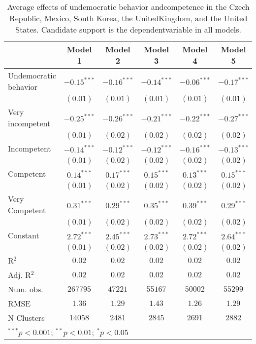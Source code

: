 
\begin{table}[!htbp]
\caption{Average effects of undemocratic behavior andcompetence in the Czech Republic, Mexico, South Korea, the UnitedKingdom, and the United States. Candidate support is the dependentvariable in all models.}
\begin{center}
\begin{tabular}{l c c c c c}
\hline
 & Model 1 & Model 2 & Model 3 & Model 4 & Model 5 \\
\hline
Undemocratic behavior & $-0.15^{***}$ & $-0.16^{***}$ & $-0.14^{***}$ & $-0.06^{***}$ & $-0.17^{***}$ \\
                      & $(0.01)$      & $(0.01)$      & $(0.01)$      & $(0.01)$      & $(0.01)$      \\
Very incompetent      & $-0.25^{***}$ & $-0.26^{***}$ & $-0.21^{***}$ & $-0.22^{***}$ & $-0.27^{***}$ \\
                      & $(0.01)$      & $(0.02)$      & $(0.02)$      & $(0.02)$      & $(0.02)$      \\
Incompetent           & $-0.14^{***}$ & $-0.12^{***}$ & $-0.12^{***}$ & $-0.16^{***}$ & $-0.13^{***}$ \\
                      & $(0.01)$      & $(0.02)$      & $(0.02)$      & $(0.02)$      & $(0.02)$      \\
Competent             & $0.14^{***}$  & $0.17^{***}$  & $0.15^{***}$  & $0.13^{***}$  & $0.15^{***}$  \\
                      & $(0.01)$      & $(0.02)$      & $(0.02)$      & $(0.02)$      & $(0.02)$      \\
Very Competent        & $0.31^{***}$  & $0.29^{***}$  & $0.35^{***}$  & $0.39^{***}$  & $0.29^{***}$  \\
                      & $(0.01)$      & $(0.02)$      & $(0.02)$      & $(0.02)$      & $(0.02)$      \\
Constant              & $2.72^{***}$  & $2.45^{***}$  & $2.73^{***}$  & $2.72^{***}$  & $2.64^{***}$  \\
                      & $(0.01)$      & $(0.02)$      & $(0.02)$      & $(0.02)$      & $(0.02)$      \\
\hline
R$^2$                 & $0.02$        & $0.02$        & $0.02$        & $0.02$        & $0.02$        \\
Adj. R$^2$            & $0.02$        & $0.02$        & $0.02$        & $0.02$        & $0.02$        \\
Num. obs.             & $267795$      & $47221$       & $55167$       & $50002$       & $55299$       \\
RMSE                  & $1.36$        & $1.29$        & $1.43$        & $1.26$        & $1.29$        \\
N Clusters            & $14058$       & $2481$        & $2845$        & $2691$        & $2882$        \\
\hline
\multicolumn{6}{l}{\scriptsize{$^{***}p<0.001$; $^{**}p<0.01$; $^{*}p<0.05$}}
\end{tabular}
\label{table_a1}
\end{center}
\end{table}
